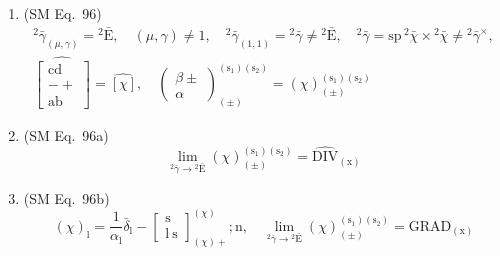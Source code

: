 \documentclass[12pt]{article}
\begin{document}
\begin{enumerate}[label=(\arabic*), series=formellist]
    \item (SM Eq.\ 96) 
    \[
    \begin{gathered}
    {}^2\bar{\gamma}_{(\mu,\gamma)} = {}^2\bar{\mathrm{E}}, \quad (\mu, \gamma) \ne 1, \quad {}^2\bar{\gamma}_{(1,1)} = {}^2\bar{\gamma} \ne {}^2\bar{\mathrm{E}}, \quad {}^2\bar{\gamma} = \mathrm{sp}\,{}^2\bar{\chi} \times {}^2\bar{\chi} \ne {}^2\bar{\gamma}^\times, \\
    \widehat{\left[ \begin{smallmatrix} \mathrm{cd} \\ - + \\ \mathrm{ab} \end{smallmatrix} \right]} = \widehat{[\chi]}, \quad \left( \begin{smallmatrix} \beta \pm \\ \alpha \end{smallmatrix} \right)^{(\mathrm{s}_1)(\mathrm{s}_2)}_{(\pm)} = (\chi)^{(\mathrm{s}_1)(\mathrm{s}_2)}_{(\pm)}
    \end{gathered}
    \]

    \item (SM Eq.\ 96a) 
    \[
    \lim_{{}^2\bar{\gamma} \to {}^2\bar{\mathrm{E}}} (\chi)^{(\mathrm{s}_1)(\mathrm{s}_2)}_{(\pm)} = \widehat{\mathrm{DIV}}_{(\mathrm{x})}
    \]

    \item (SM Eq.\ 96b) 
    \[
    (\chi)_\mathrm{l} = \frac{1}{\alpha_\mathrm{l}}\bar{\delta}_\mathrm{l} - \left[ \begin{smallmatrix} \mathrm{s} \\ \mathrm{l}\ \mathrm{s} \end{smallmatrix} \right]^{(\chi)}_{(\chi)+};\mathrm{n}, \quad \lim_{{}^2\bar{\gamma} \to {}^2\bar{\mathrm{E}}} (\chi)^{(\mathrm{s}_1)(\mathrm{s}_2)}_{(\pm)} = \mathrm{GRAD}_{(\mathrm{x})}
    \]


\end{enumerate}
\end{document}

